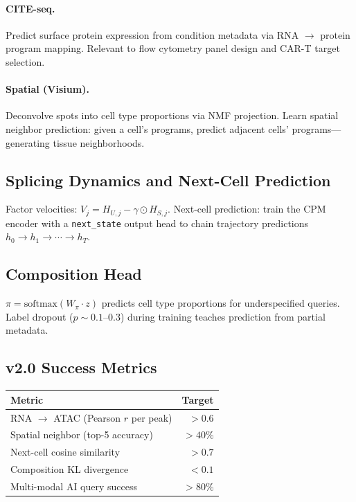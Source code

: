 \documentclass[10pt,twocolumn,letterpaper]{article}
\begin{document}
\paragraph{CITE-seq.} Predict surface protein expression from condition
metadata via RNA $\to$ protein program mapping. Relevant to flow cytometry
panel design and CAR-T target selection.

\paragraph{Spatial (Visium).} Deconvolve spots into cell type proportions via
NMF projection. Learn spatial neighbor prediction: given a cell's programs,
predict adjacent cells' programs---generating tissue neighborhoods.

\subsection{Splicing Dynamics and Next-Cell Prediction}

Factor velocities: $V_j = H_{U,j} - \gamma \odot H_{S,j}$. Next-cell
prediction: train the CPM encoder with a \texttt{next\_state} output head to
chain trajectory predictions $h_0 \to h_1 \to \cdots \to h_T$.

\subsection{Composition Head}

$\pi = \text{softmax}(W_\pi \cdot z)$ predicts cell type proportions for
underspecified queries. Label dropout ($p \sim 0.1$--$0.3$) during training
teaches prediction from partial metadata.

\subsection{v2.0 Success Metrics}

\begin{table}[h]
\centering\small
\begin{tabular}{@{}lr@{}}
\toprule
Metric & Target \\
\midrule
RNA $\to$ ATAC (Pearson $r$ per peak) & ${>}0.6$ \\
Spatial neighbor (top-5 accuracy) & ${>}40\%$ \\
Next-cell cosine similarity & ${>}0.7$ \\
Composition KL divergence & ${<}0.1$ \\
Multi-modal AI query success & ${>}80\%$ \\
\bottomrule
\end{tabular}
\end{table}
\end{document}
